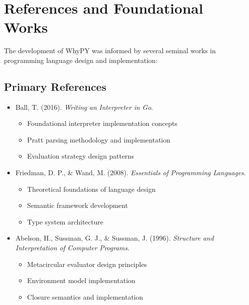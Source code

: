 \documentclass[11pt]{article}
\newenvironment{feature}
{\begin{tcolorbox}[
    colback=lightgray,
    colframe=primary,
    arc=0mm,
    boxrule=1pt
]}
{\end{tcolorbox}}
\begin{document}
\section{References and Foundational Works}
\begin{feature}
The development of WhyPY was informed by several seminal works in programming language design and implementation:

\subsection*{Primary References}
\begin{itemize}[label=\textcolor{primary}{\faBook}]
    \item Ball, T. (2016). \textit{Writing an Interpreter in Go}. 
    \begin{itemize}[label=\textcolor{secondary}{\faAngleRight}]
        \item Foundational interpreter implementation concepts
        \item Pratt parsing methodology and implementation
        \item Evaluation strategy design patterns
    \end{itemize}

    \item Friedman, D. P., \& Wand, M. (2008). \textit{Essentials of Programming Languages}.
    \begin{itemize}[label=\textcolor{secondary}{\faAngleRight}]
        \item Theoretical foundations of language design
        \item Semantic framework development
        \item Type system architecture
    \end{itemize}

    \item Abelson, H., Sussman, G. J., \& Sussman, J. (1996). \textit{Structure and Interpretation of Computer Programs}.
    \begin{itemize}[label=\textcolor{secondary}{\faAngleRight}]
        \item Metacircular evaluator design principles
        \item Environment model implementation
        \item Closure semantics and implementation
    \end{itemize}
\end{itemize}
\end{feature}
\end{document}
